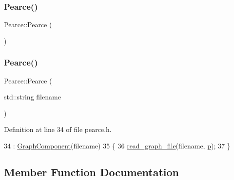 \subsubsection{\texorpdfstring{Pearce()}{Pearce()}\hspace{0.1cm}{\footnotesize\ttfamily [1/2]}}
{\footnotesize\ttfamily Pearce\+::\+Pearce (\begin{DoxyParamCaption}{ }\end{DoxyParamCaption})\hspace{0.3cm}{\ttfamily [default]}}

\mbox{\label{class_pearce_a0851b1b696528448c1a42dbb6b4e6c8f}} 
\subsubsection{\texorpdfstring{Pearce()}{Pearce()}\hspace{0.1cm}{\footnotesize\ttfamily [2/2]}}
{\footnotesize\ttfamily Pearce\+::\+Pearce (\begin{DoxyParamCaption}\item[{std\+::string}]{filename }\end{DoxyParamCaption})\hspace{0.3cm}{\ttfamily [inline]}}



Definition at line 34 of file pearce.\+h.


\begin{DoxyCode}
34                              : \hyperlink{class_graph_component_a35c4a6e5c6f28751b1bd6c451cc07957}{GraphComponent}(filename)
35   \{
36     \hyperlink{class_graph_component_a680363eab8b992d739f055bd484bc000}{read\_graph\_file}(filename, \hyperlink{class_pearce_a2320928312fd97f6bcb1f16684f79a03}{p});
37   \}
\end{DoxyCode}


\subsection{Member Function Documentation}
\mbox{\label{class_pearce_a6d6c641f1815e11536554077ed18c10e}} 

